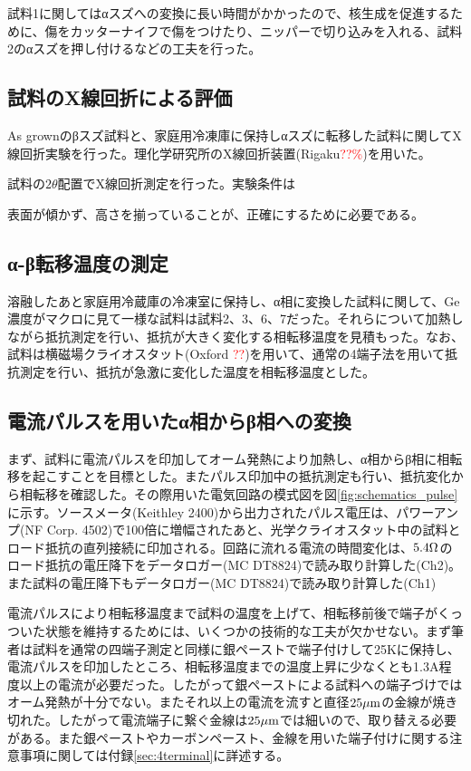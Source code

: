 試料1に関してはαスズへの変換に長い時間がかかったので、核生成を促進するために、傷をカッターナイフで傷をつけたり、ニッパーで切り込みを入れる、試料2のαスズを押し付けるなどの工夫を行った。

\subsection{試料のX線回折による評価}
\label{sec:Xray_experiment}
As grownのβスズ試料と、家庭用冷凍庫に保持しαスズに転移した試料に関してX線回折実験を行った。理化学研究所のX線回折装置(Rigaku\textcolor{red}{??\%})を用いた。

試料の$2\theta$配置でX線回折測定を行った。実験条件は

表面が傾かず、高さを揃っていることが、正確にするために必要である。


\subsection{α-β転移温度の測定}
溶融したあと家庭用冷蔵庫の冷凍室に保持し、α相に変換した試料に関して、Ge濃度がマクロに見て一様な試料は試料2、3、6、7だった。それらについて加熱しながら抵抗測定を行い、抵抗が大きく変化する相転移温度を見積もった。なお、試料は横磁場クライオスタット(Oxford \textcolor{red}{??})を用いて、通常の4端子法を用いて抵抗測定を行い、抵抗が急激に変化した温度を相転移温度とした。

\subsection{電流パルスを用いたα相からβ相への変換}
まず、試料に電流パルスを印加してオーム発熱により加熱し、α相からβ相に相転移を起こすことを目標とした。またパルス印加中の抵抗測定も行い、抵抗変化から相転移を確認した。その際用いた電気回路の模式図を図\ref{fig:schematics_pulse}に示す。ソースメータ(Keithley 2400)から出力されたパルス電圧は、パワーアンプ(NF Corp. 4502)で100倍に増幅されたあと、光学クライオスタット中の試料とロード抵抗の直列接続に印加される。回路に流れる電流の時間変化は、$\rm 5.4\Omega$のロード抵抗の電圧降下をデータロガー(MC DT8824)で読み取り計算した(Ch2)。また試料の電圧降下もデータロガー(MC DT8824)で読み取り計算した(Ch1)

電流パルスにより相転移温度まで試料の温度を上げて、相転移前後で端子がくっついた状態を維持するためには、いくつかの技術的な工夫が欠かせない。まず筆者は試料を通常の四端子測定と同様に銀ペーストで端子付けして25Kに保持し、電流パルスを印加したところ、相転移温度までの温度上昇に少なくとも1.3A程度以上の電流が必要だった。したがって銀ペーストによる試料への端子づけではオーム発熱が十分でない。またそれ以上の電流を流すと直径$\rm 25 \mu m$の金線が焼き切れた。したがって電流端子に繋ぐ金線は$\rm 25 \mu m$では細いので、取り替える必要がある。また銀ペーストやカーボンペースト、金線を用いた端子付けに関する注意事項に関しては付録\ref{sec:4terminal}に詳述する。

